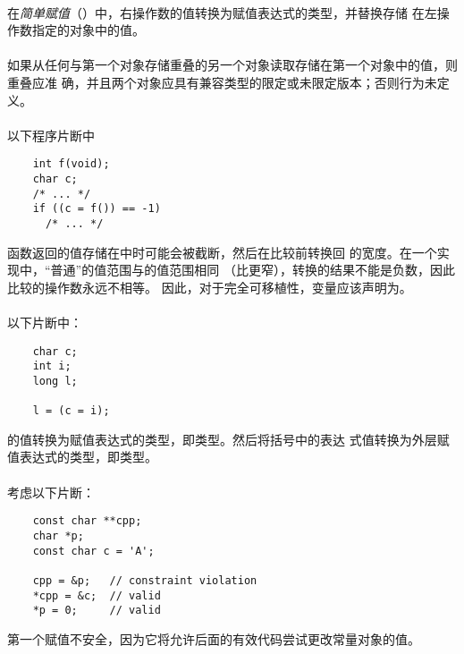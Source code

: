 {\semantic
\paragraph{}
在\textit{简单赋值}（\tm{=}）中，右操作数的值转换为赋值表达式的类型，并替换存储
在左操作数指定的对象中的值。

\paragraph{}
如果从任何与第一个对象存储重叠的另一个对象读取存储在第一个对象中的值，则重叠应准
确，并且两个对象应具有兼容类型的限定或未限定版本；否则行为未定义。

\paragraph{}
\ex 以下程序片断中
\begin{lstlisting}
    int f(void);
    char c;
    /* ... */
    if ((c = f()) == -1)
      /* ... */
\end{lstlisting}
函数返回的值存储在中时可能会被截断，然后在比较前转换回
的宽度。在一个实现中，``普通''的值范围与的值范围相同
（比更窄），转换的结果不能是负数，因此比较的操作数永远不相等。
因此，对于完全可移植性，变量应该声明为。

\paragraph{}
\ex 以下片断中：
\begin{lstlisting}
    char c;
    int i;
    long l;

    l = (c = i);
\end{lstlisting}
的值转换为赋值表达式的类型，即类型。然后将括号中的表达
式值转换为外层赋值表达式的类型，即类型。

\paragraph{}
\ex 考虑以下片断：
\begin{lstlisting}
    const char **cpp;
    char *p;
    const char c = 'A';

    cpp = &p;   // constraint violation
    *cpp = &c;  // valid
    *p = 0;     // valid
\end{lstlisting}
第一个赋值不安全，因为它将允许后面的有效代码尝试更改常量对象的值。

}
